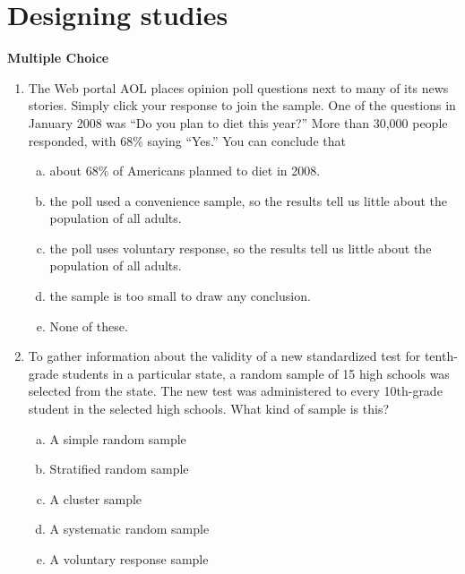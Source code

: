 \documentclass[a4paper,12pt,twoside]{book}
\begin{document}
\pagestyle{fancy}
\fancyhf{}
\renewcommand{\chaptermark}[1]{ \markboth{#1}{} }
\fancyhead[CE,CO]{\leftmark}
\fancyfoot[LE,RO]{\thepage}
\chapter{Designing studies}
\newpage
\textbf{Multiple Choice}\vspace{0.3cm}

\begin{enumerate}
\item  The Web portal AOL places opinion poll questions next to many of its news stories. Simply click your response to join the sample. One of the questions in January 2008 was  ``Do you plan to diet this year?''  More than 30,000 people responded, with 68\% saying ``Yes.'' You can conclude that
   \begin{enumerate}[(a)]
       \item about 68\% of Americans planned to diet in 2008.
       \item  the poll used a convenience sample, so the results tell us little about the population of all adults.
       \item the poll uses voluntary response, so the results tell us little about the population of all adults.
       \item the sample is too small to draw any conclusion.
       \item None of these.
   \end{enumerate}
   
   \item To gather information about the validity of a new standardized test for tenth-grade students in a particular state, a random sample of 15 high schools was selected from the state. The new test was administered to every 10th-grade student in the selected high schools. What kind of sample is this?
    \begin{enumerate}[(a)]
        \item A simple random sample
        \item Stratified random sample
        \item A cluster sample
        \item A systematic random sample
        \item A voluntary response sample
    \end{enumerate}
    

\end{enumerate}
\end{document}
